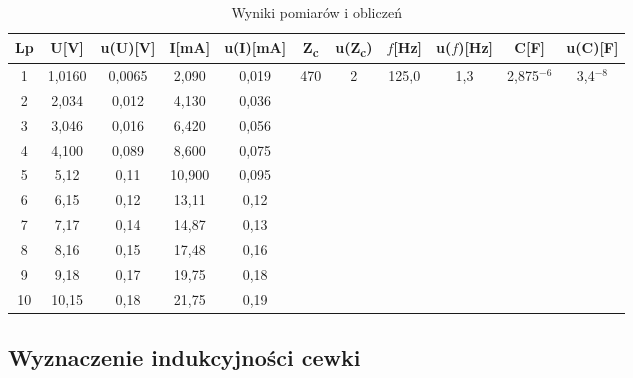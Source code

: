 \documentclass[12pt]{article}
\begin{document}
\begin{table}[h]
    \centering
    \caption{Wyniki pomiarów i obliczeń}
    \label{tab:tabela1}
    \begin{tabular}{|c|c|c|c|c|c|c|c|c|c|c|} \hline
    Lp & U[V] & u(U)[V] & I[mA] & u(I)[mA] & Z\textsubscript{c} & u(Z\textsubscript{c}) & $f$[Hz] & u($f$)[Hz] & C[F] & u(C)[F] \\ \hline
    1 & 1,0160 & 0,0065 & 2,090 & 0,019 & \multirow{10}{*}{470} & \multirow{10}{*}{2} & \multirow{10}{*}{125,0} & \multirow{10}{*}{1,3} & \multirow{10}{*}{2,875$^{-6}$} & \multirow{10}{*}{3,4$^{-8}$} \\ \cline{1-5}
    2 & 2,034 & 0,012 & 4,130 & 0,036 & & & & & & \\ \cline{1-5}
    3 & 3,046 & 0,016 & 6,420 & 0,056 & & & & & & \\ \cline{1-5}
    4 & 4,100 & 0,089 & 8,600 & 0,075 & & & & & & \\ \cline{1-5}
    5 & 5,12 & 0,11 & 10,900 & 0,095 & & & & & & \\ \cline{1-5}
    6 & 6,15 & 0,12 & 13,11 & 0,12 & & & & & & \\ \cline{1-5}
    7 & 7,17 & 0,14 & 14,87 & 0,13 & & & & & & \\ \cline{1-5}
    8 & 8,16 & 0,15 & 17,48 & 0,16 & & & & & & \\ \cline{1-5}
    9 & 9,18 & 0,17 & 19,75 & 0,18 & & & & & & \\ \cline{1-5}
    10 & 10,15 & 0,18 & 21,75 & 0,19 & & & & & & \\ \hline
    \end{tabular}
\end{table}

\subsection{Wyznaczenie indukcyjności cewki}
\end{document}
